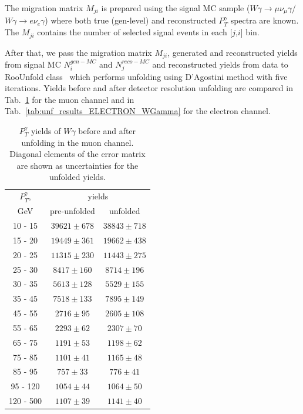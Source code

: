 
The migration matrix $M_{ji}$ is prepared using the signal MC sample ($W\gamma\rightarrow\mu\nu_{\mu}\gamma$/$W\gamma\rightarrow{e}\nu_{e}\gamma$) where both true (gen-level) and reconstructed $P_T^\gamma$ spectra are known. The $M_{ji}$ contains the number of selected signal events in each [$j$,$i$] bin. 

After that, we pass the migration matrix $M_{ji}$, generated and reconstructed yields from signal MC $N^{gen-MC}_i$ and $N^{reco-MC}_j$ and reconstructed yields from data to RooUnfold class~\cite{ref_RooUnfold} which performs unfolding using D'Agostini method with five iterations. Yields before and after detector resolution unfolding are compared in Tab.~\ref{tab:unf_results_MUON_WGamma} for the muon channel and in Tab.~\ref{tab:unf_results_ELECTRON_WGamma} for the electron channel. 

\begin{table}[h]
  \scriptsize
  \begin{center}
  \caption{$P_T^{\gamma}$ yields of $W\gamma$ before and after unfolding in the muon channel. Diagonal elements of the error matrix are shown as uncertainties for the unfolded yields.}
  \begin{tabular}{|c|c|c|}
\hline
  $P_T^{\gamma}$, &  \multicolumn{2}{|c|}{yields} \\ 
  GeV           & pre-unfolded &  unfolded  \\ \hline

 10 -  15 &     $39621 \pm 678$ &     $38843 \pm 718$  \\ \hline
 15 -  20 &     $19449 \pm 361$ &     $19662 \pm 438$  \\ \hline
 20 -  25 &     $11315 \pm 230$ &     $11443 \pm 275$  \\ \hline
 25 -  30 &     $8417 \pm 160$ &     $8714 \pm 196$  \\ \hline
 30 -  35 &     $5613 \pm 128$ &     $5529 \pm 155$  \\ \hline
 35 -  45 &     $7518 \pm 133$ &     $7895 \pm 149$  \\ \hline
 45 -  55 &     $2716 \pm  95$ &     $2605 \pm 108$  \\ \hline
 55 -  65 &     $2293 \pm  62$ &     $2307 \pm  70$  \\ \hline
 65 -  75 &     $1191 \pm  53$ &     $1198 \pm  62$  \\ \hline
 75 -  85 &     $1101 \pm  41$ &     $1165 \pm  48$  \\ \hline
 85 -  95 &     $757 \pm  33$ &     $776 \pm  41$  \\ \hline
 95 - 120 &     $1054 \pm  44$ &     $1064 \pm  50$  \\ \hline
120 - 500 &     $1107 \pm  39$ &     $1141 \pm  40$  \\ \hline
  \end{tabular}
  \label{tab:unf_results_MUON_WGamma}
  \end{center}
\end{table}

